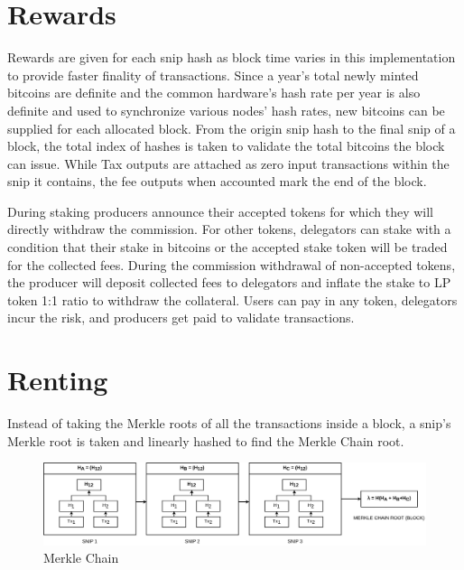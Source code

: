 \documentclass[a4paper,10pt]{article}
\begin{document}
\section{Rewards}
Rewards are given for each snip hash as block time varies in this implementation to provide faster finality of transactions. Since a year's total newly minted bitcoins are definite and the common hardware's hash rate per year is also definite and used to synchronize various nodes' hash rates, new bitcoins can be supplied for each allocated block. From the origin snip hash to the final snip of a block, the total index of hashes is taken to validate the total bitcoins the block can issue. While Tax outputs are attached as zero input transactions within the snip it contains, the fee outputs when accounted mark the end of the block. 

During staking producers announce their accepted tokens for which they will directly withdraw the commission. For other tokens, delegators can stake with a condition that their stake in bitcoins or the accepted stake token will be traded for the collected fees. During the commission withdrawal of non-accepted tokens, the producer will deposit collected fees to delegators and inflate the stake to LP token 1:1 ratio to withdraw the collateral. Users can pay in any token, delegators incur the risk, and producers get paid to validate transactions.

\section{Renting}
Instead of taking the Merkle roots of all the transactions inside a block, a snip's Merkle root is taken and linearly hashed to find the Merkle Chain root. \\


\begin{figure}[h]
\begin{center}
\includegraphics[width=13cm]{merklechain}
\caption{Merkle Chain}
\end{center}
\end{figure}
\end{document}

